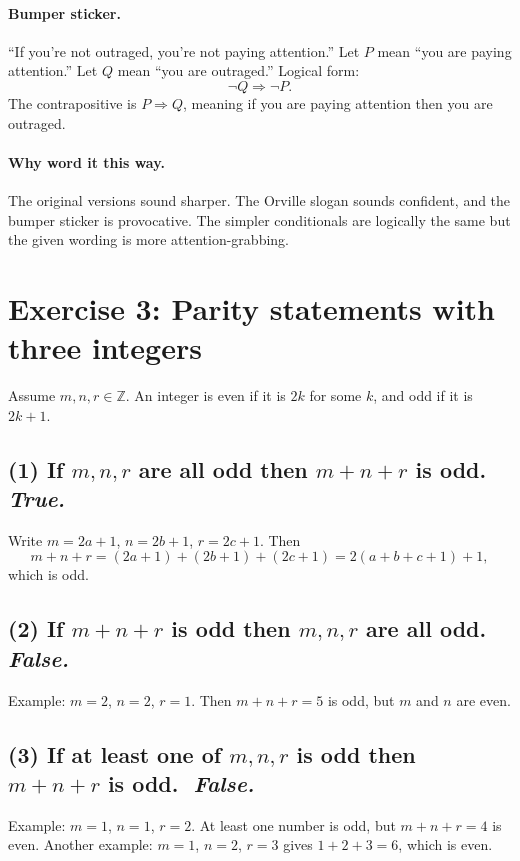 \documentclass[11pt]{article}
\begin{document}
\paragraph{Bumper sticker.}
“If you’re not outraged, you’re not paying attention.”  
Let $P$ mean “you are paying attention.” Let $Q$ mean “you are outraged.”  
Logical form:
\[
\neg Q \Rightarrow \neg P.
\]
The contrapositive is $P \Rightarrow Q$, meaning if you are paying attention then you are outraged.

\paragraph{Why word it this way.}
The original versions sound sharper. The Orville slogan sounds confident, and the bumper sticker is provocative. The simpler conditionals are logically the same but the given wording is more attention-grabbing.

\bigskip

\section*{Exercise 3: Parity statements with three integers}

Assume $m,n,r\in\mathbb{Z}$. An integer is even if it is $2k$ for some $k$, and odd if it is $2k+1$.

\subsection*{(1) If $m,n,r$ are all odd then $m+n+r$ is odd. \,\,\textit{True.}}
Write $m=2a+1$, $n=2b+1$, $r=2c+1$. Then
\[
m+n+r = (2a+1)+(2b+1)+(2c+1) = 2(a+b+c+1)+1,
\]
which is odd.

\subsection*{(2) If $m+n+r$ is odd then $m,n,r$ are all odd. \,\,\textit{False.}}
Example: $m=2$, $n=2$, $r=1$. Then $m+n+r=5$ is odd, but $m$ and $n$ are even.

\subsection*{(3) If at least one of $m,n,r$ is odd then $m+n+r$ is odd. \,\,\textit{False.}}
Example: $m=1$, $n=1$, $r=2$. At least one number is odd, but $m+n+r=4$ is even.  
Another example: $m=1$, $n=2$, $r=3$ gives $1+2+3=6$, which is even.
\end{document}
